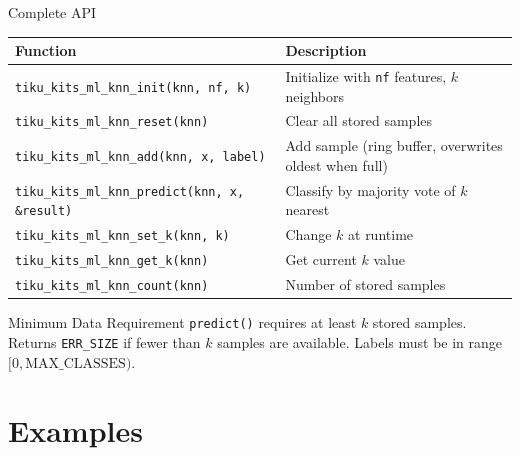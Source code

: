 \documentclass[aspectratio=169, 10pt]{beamer}
\begin{document}
\begin{frame}[fragile]{Complete API}
\begin{table}
\centering
\small
\begin{tabular}{@{}lp{8cm}@{}}
\toprule
\textbf{Function} & \textbf{Description} \\
\midrule
\texttt{tiku\_kits\_ml\_knn\_init(knn, nf, k)}
  & Initialize with \texttt{nf} features, $k$ neighbors \\
\texttt{tiku\_kits\_ml\_knn\_reset(knn)}
  & Clear all stored samples \\
\texttt{tiku\_kits\_ml\_knn\_add(knn, x, label)}
  & Add sample (ring buffer, overwrites oldest when full) \\
\midrule
\texttt{tiku\_kits\_ml\_knn\_predict(knn, x, \&result)}
  & Classify by majority vote of $k$ nearest \\
\midrule
\texttt{tiku\_kits\_ml\_knn\_set\_k(knn, k)}
  & Change $k$ at runtime \\
\texttt{tiku\_kits\_ml\_knn\_get\_k(knn)}
  & Get current $k$ value \\
\texttt{tiku\_kits\_ml\_knn\_count(knn)}
  & Number of stored samples \\
\bottomrule
\end{tabular}
\end{table}

\vspace{0.3em}
\begin{alertblock}{Minimum Data Requirement}
\texttt{predict()} requires at least $k$ stored samples.
Returns \texttt{ERR\_SIZE} if fewer than $k$ samples are available.
Labels must be in range $[0, \text{MAX\_CLASSES})$.
\end{alertblock}
\end{frame}

\section{Examples}
\end{document}
